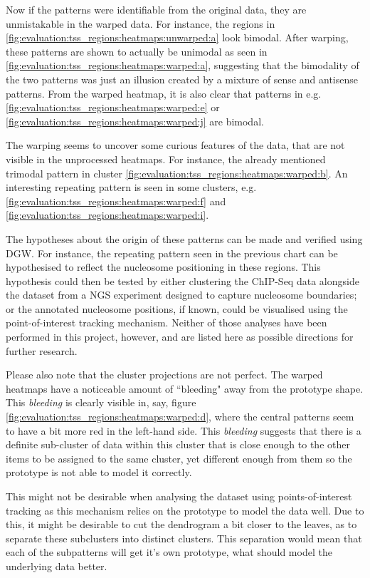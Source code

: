 \documentclass[parskip]{cs4rep}
\begin{document}
Now if the patterns were identifiable from the original data, they are unmistakable in the warped data. For instance, the regions in \autoref{fig:evaluation:tss_regions:heatmaps:unwarped:a} look bimodal. After warping, these patterns are shown to actually be unimodal as seen in \autoref{fig:evaluation:tss_regions:heatmaps:warped:a}, suggesting that the bimodality of the two patterns was just an illusion created by a mixture of sense and antisense patterns.
From the warped heatmap, it is also clear that patterns in e.g. \autoref{fig:evaluation:tss_regions:heatmaps:warped:e} or \autoref{fig:evaluation:tss_regions:heatmaps:warped:j} are bimodal.

The warping seems to uncover some curious features of the data, that are not visible in the unprocessed heatmaps. For instance, the already mentioned trimodal pattern in cluster \autoref{fig:evaluation:tss_regions:heatmaps:warped:b}.
An interesting repeating pattern is seen in some clusters, e.g. \autoref{fig:evaluation:tss_regions:heatmaps:warped:f} and \autoref{fig:evaluation:tss_regions:heatmaps:warped:i}.

The hypotheses about the origin of these patterns can be made and verified using DGW.
For instance, the repeating pattern seen in the previous chart can be hypothesised to reflect the nucleosome positioning in these regions. This hypothesis could then be tested by either clustering the ChIP-Seq data alongside the dataset from a NGS experiment designed to capture nucleosome boundaries;
or the annotated nucleosome positions, if known, could be visualised using the point-of-interest tracking mechanism. Neither of those analyses have been performed in this project, however, and are listed here as possible directions for further research.

Please also note that the cluster projections are not perfect. The warped heatmaps have a noticeable amount of ``bleeding" away from the prototype shape. 
This \emph{bleeding} is clearly visible in, say, figure \autoref{fig:evaluation:tss_regions:heatmaps:warped:d}, where the central patterns seem to have a bit more red in the left-hand side. This \emph{bleeding} suggests that there is a definite sub-cluster of data within this cluster that is close enough to the other items to be assigned to the same cluster, yet different enough from them so the prototype is not able to model it correctly. 

This might not be desirable when analysing the dataset using points-of-interest tracking as this mechanism relies on the prototype to model the data well. 
Due to this, it might be desirable to cut the dendrogram a bit closer to the leaves, as to separate these subclusters into distinct clusters. This separation would mean that each of the subpatterns will get it's own prototype, what should model the underlying data better.
\end{document}
